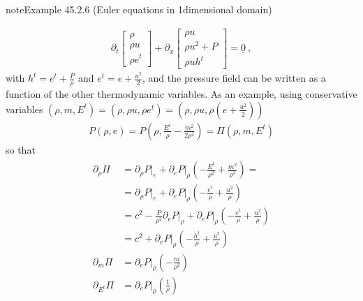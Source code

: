 \documentclass[letterpaper,10pt,english]{jupyterBook}
\begin{document}
\begin{sphinxadmonition}{note}{Example 45.2.6 (Euler equations in 1\sphinxhyphen{}dimensional domain)}



\sphinxAtStartPar
{}
\begin{equation*}
\begin{split}\partial_t \begin{bmatrix} \rho \\ \rho u \\ \rho e^t \end{bmatrix} + \partial_x \begin{bmatrix} \rho u \\ \rho u^2 + P \\ \rho u h^t  \end{bmatrix} = \underline{0} \ ,\end{split}
\end{equation*}
\sphinxAtStartPar
with \(h^t = e^t + \frac{P}{\rho}\) and \(e^t = e + \frac{u^2}{2}\), and the pressure field can be written as a function of the other thermodynamic variables. As an example, using conservative variables \((\rho, m, E^t) = (\rho, \rho u, \rho e^t) = \left(\rho, \rho u, \rho \left(e + \frac{u^2}{2}\right) \right)\)
\begin{equation*}
\begin{split}P(\rho, e) = P\left(\rho, \frac{E^t}{\rho} - \frac{m^2}{2 \rho^2}\right) = \Pi\left( \rho, m, E^t \right)\end{split}
\end{equation*}
\sphinxAtStartPar
so that
\begin{equation*}
\begin{split}\begin{aligned}
 \partial_{\rho} \Pi
  & = \partial_\rho P \big|_e + \partial_e P \big|_\rho \left( -\frac{E^t}{\rho^2} + \frac{m^2}{\rho^3} \right) = \\
  & = \partial_\rho P \big|_e + \partial_e P \big|_\rho \left( - \frac{e^t}{\rho} + \frac{u^2}{\rho} \right) \\
  & = c^2 - \frac{P}{\rho^2} \partial_e P \big|_\rho + \partial_e P \big|_\rho \left( - \frac{e^t}{\rho} + \frac{u^2}{\rho} \right) \\
  & = c^2 + \partial_e P \big|_\rho \left( - \frac{h^t}{\rho} + \frac{u^2}{\rho} \right) \\
 \partial_{m   } \Pi & = \partial_e P \big|_\rho \left( - \frac{m}{\rho^2}  \right) \\
 \partial_{E^t } \Pi & = \partial_e P \big|_\rho \left( \frac{1}{\rho} \right) \\
\end{aligned}\end{split}
\end{equation*}



\end{sphinxadmonition}
\end{document}
